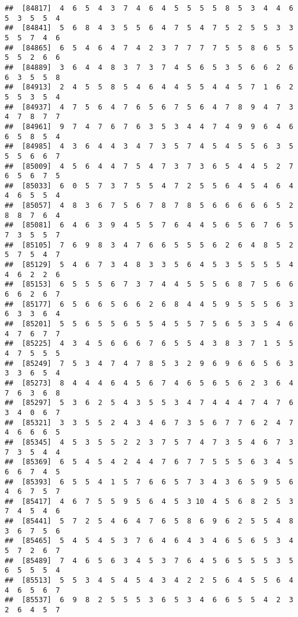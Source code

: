 \documentclass[
]{book}
\begin{document}
\begin{verbatim}
##  [84817]  4  6  5  4  3  7  4  6  4  5  5  5  5  8  5  3  4  4  6  5  3  5  5  4
##  [84841]  5  6  8  4  3  5  5  6  4  7  5  4  7  5  2  5  5  3  3  5  5  7  4  6
##  [84865]  6  5  4  6  4  7  4  2  3  7  7  7  7  5  5  8  6  5  5  5  5  2  6  6
##  [84889]  3  6  4  4  8  3  7  3  7  4  5  6  5  3  5  6  6  2  6  6  3  5  5  8
##  [84913]  2  4  5  5  8  5  4  6  4  4  5  5  4  4  5  7  1  6  2  5  5  3  5  4
##  [84937]  4  7  5  6  4  7  6  5  6  7  5  6  4  7  8  9  4  7  3  4  7  8  7  7
##  [84961]  9  7  4  7  6  7  6  3  5  3  4  4  7  4  9  9  6  4  6  6  5  8  5  4
##  [84985]  4  3  6  4  4  3  4  7  3  5  7  4  5  4  5  5  6  3  5  5  5  6  6  7
##  [85009]  4  5  6  4  4  7  5  4  7  3  7  3  6  5  4  4  5  2  7  6  5  6  7  5
##  [85033]  6  0  5  7  3  7  5  5  4  7  2  5  5  6  4  5  4  6  4  4  6  5  5  4
##  [85057]  4  8  3  6  7  5  6  7  8  7  8  5  6  6  6  6  6  5  2  8  8  7  6  4
##  [85081]  6  4  6  3  9  4  5  5  7  6  4  4  5  6  5  6  7  6  5  7  3  5  5  7
##  [85105]  7  6  9  8  3  4  7  6  6  5  5  5  6  2  6  4  8  5  2  5  7  5  4  7
##  [85129]  5  4  6  7  3  4  8  3  3  5  6  4  5  3  5  5  5  5  4  4  6  2  2  6
##  [85153]  6  5  5  5  6  7  3  7  4  4  5  5  5  6  8  7  5  6  6  6  6  2  6  7
##  [85177]  6  5  6  6  5  6  6  2  6  8  4  4  5  9  5  5  5  6  3  6  3  3  6  4
##  [85201]  5  5  6  5  5  6  5  5  4  5  5  7  5  6  5  3  5  4  6  4  7  6  7  7
##  [85225]  4  3  4  5  6  6  6  7  6  5  5  4  3  8  3  7  1  5  5  4  7  5  5  5
##  [85249]  7  5  3  4  7  4  7  8  5  3  2  9  6  9  6  6  5  6  3  3  3  6  5  4
##  [85273]  8  4  4  4  6  4  5  6  7  4  6  5  6  5  6  2  3  6  4  7  6  3  6  8
##  [85297]  5  3  6  2  5  4  3  5  5  3  4  7  4  4  4  7  4  7  6  3  4  0  6  7
##  [85321]  3  3  5  5  2  4  3  4  6  7  3  5  6  7  7  6  2  4  7  4  6  6  6  5
##  [85345]  4  5  3  5  5  2  2  3  7  5  7  4  7  3  5  4  6  7  3  7  3  5  4  4
##  [85369]  6  5  4  5  4  2  4  4  7  6  7  7  5  5  5  6  3  4  5  6  6  7  4  5
##  [85393]  6  5  5  4  1  5  7  6  6  5  7  3  4  3  6  5  9  5  6  4  6  7  5  7
##  [85417]  4  6  7  5  5  9  5  6  4  5  3 10  4  5  6  8  2  5  3  7  4  5  4  6
##  [85441]  5  7  2  5  4  6  4  7  6  5  8  6  9  6  2  5  5  4  8  3  6  7  5  6
##  [85465]  5  4  5  4  5  3  7  6  4  6  4  3  4  6  5  6  5  3  4  5  7  2  6  7
##  [85489]  7  4  6  5  6  3  4  5  3  7  6  4  5  6  5  5  5  3  5  6  5  5  5  4
##  [85513]  5  5  3  4  5  4  5  4  3  4  2  2  5  6  4  5  5  6  4  4  6  5  6  7
##  [85537]  6  9  8  2  5  5  5  3  6  5  3  4  6  6  5  5  4  2  3  2  6  4  5  7

\end{verbatim}
\end{document}
